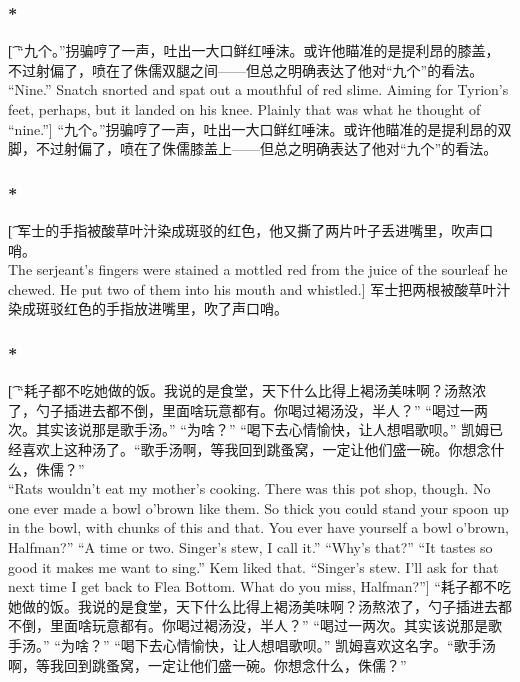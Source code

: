 \documentclass[12pt,a4paper]{article}
\begin{document}
\subsubsection{\color{red}*}\t[
	“九个。”拐骗哼了一声，吐出一大口鲜红唾沫。或许他瞄准的是提利昂的膝盖，不过射偏了，喷在了侏儒双腿之间——但总之明确表达了他对“九个”的看法。\\
	“Nine.” Snatch snorted and spat out a mouthful of red slime. Aiming for Tyrion's feet, perhaps, but it landed on his knee. Plainly that was what he thought of “nine.”]
	“九个。”拐骗哼了一声，吐出一大口鲜红唾沫。或许他瞄准的是提利昂的双脚，不过射偏了，喷在了侏儒膝盖上——但总之明确表达了他对“九个”的看法。

\subsubsection{\color{red}*}\t[
	军士的手指被酸草叶汁染成斑驳的红色，他又撕了两片叶子丢进嘴里，吹声口哨。\\
	The serjeant's fingers were stained a mottled red from the juice of the sourleaf he chewed. He put two of them into his mouth and whistled.]
	军士把两根被酸草叶汁染成斑驳红色的手指放进嘴里，吹了声口哨。
	
\subsubsection{\color{red}*}\t[
	“耗子都不吃她做的饭。我说的是食堂，天下什么比得上褐汤美味啊？汤熬浓了，勺子插进去都不倒，里面啥玩意都有。你喝过褐汤没，半人？”
	“喝过一两次。其实该说那是歌手汤。”
	“为啥？”
	“喝下去心情愉快，让人想唱歌呗。”
	凯姆已经喜欢上这种汤了。“歌手汤啊，等我回到跳蚤窝，一定让他们盛一碗。你想念什么，侏儒？”\\
	“Rats wouldn't eat my mother's cooking. There was this pot shop, though. No one ever made a bowl o'brown like them. So thick you could stand your spoon up in the bowl, with chunks of this and that. You ever have yourself a bowl o'brown, Halfman?”
	“A time or two. Singer's stew, I call it.”
	“Why's that?”
	“It tastes so good it makes me want to sing.”
	Kem liked that. “Singer's stew. I'll ask for that next time I get back to Flea Bottom. What do you miss, Halfman?”]
	“耗子都不吃她做的饭。我说的是食堂，天下什么比得上褐汤美味啊？汤熬浓了，勺子插进去都不倒，里面啥玩意都有。你喝过褐汤没，半人？”
	“喝过一两次。其实该说那是歌手汤。”
	“为啥？”
	“喝下去心情愉快，让人想唱歌呗。”
	凯姆喜欢这名字。“歌手汤啊，等我回到跳蚤窝，一定让他们盛一碗。你想念什么，侏儒？”
\end{document}
